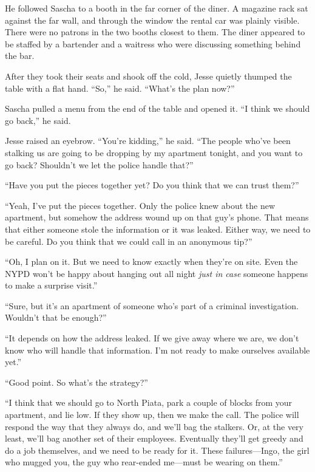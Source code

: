 \documentclass[12pt]{book}
\begin{document}
He followed Sascha to a booth in the far corner of the diner.  A magazine rack sat against the far wall, and through the window the rental car was plainly visible.  There were no patrons in the two booths closest to them.  The diner appeared to be staffed by a bartender and a waitress who were discussing something behind the bar.

After they took their seats and shook off the cold, Jesse quietly thumped the table with a flat hand.  ``So,'' he said.  ``What's the plan now?''

Sascha pulled a menu from the end of the table and opened it.  ``I think we should go back,'' he said.

Jesse raised an eyebrow.  ``You're kidding,'' he said.  ``The people who've been stalking us are going to be dropping by my apartment tonight, and you want to go back?  Shouldn't we let the police handle that?''

``Have you put the pieces together yet?  Do you think that we can trust them?''

``Yeah, I've put the pieces together.  Only the police knew about the new apartment, but somehow the address wound up on that guy's phone.  That means that either someone stole the information or it was leaked.  Either way, we need to be careful.  Do you think that we could call in an anonymous tip?''

``Oh, I plan on it.  But we need to know exactly when they're on site.  Even the NYPD won't be happy about hanging out all night \emph{just in case} someone happens to make a surprise visit.''

``Sure, but it's an apartment of someone who's part of a criminal investigation.  Wouldn't that be enough?''

``It depends on how the address leaked.  If we give away where we are, we don't know who will handle that information.  I'm not ready to make ourselves available yet.''

``Good point.  So what's the strategy?''

``I think that we should go to North Piata, park a couple of blocks from your apartment, and lie low.  If they show up, then we make the call.  The police will respond the way that they always do, and we'll bag the stalkers.  Or, at the very least, we'll bag another set of their employees.  Eventually they'll get greedy and do a job themselves, and we need to be ready for it.  These failures---Ingo, the girl who mugged you, the guy who rear-ended me---must be wearing on them.''
\end{document}
